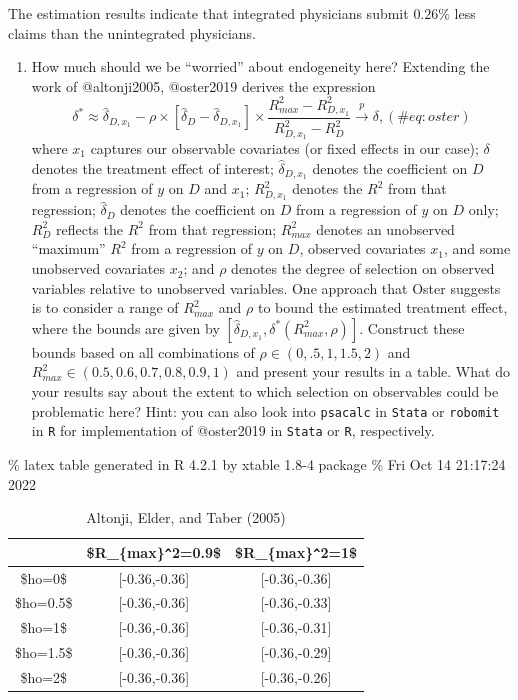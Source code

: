 \documentclass[
  12pt,
]{article}
\providecommand{\tightlist}{%
  \setlength{\itemsep}{0pt}\setlength{\parskip}{0pt}}
\begin{document}
The estimation results indicate that integrated physicians submit
\(0.26\%\) less claims than the unintegrated physicians.

\begin{enumerate}
\def\labelenumi{\arabic{enumi}.}
\setcounter{enumi}{3}
\tightlist
\item
  How much should we be ``worried'' about endogeneity here? Extending
  the work of @altonji2005, @oster2019 derives the expression
  \begin{equation}
   \delta^{*} \approx \hat{\delta}_{D,x_{1}} - \rho \times \left[\hat{\delta}_{D} - \hat{\delta}_{D,x_{1}}\right] \times \frac{R_{max}^{2} - R_{D,x_{1}}^{2}}{R_{D,x_{1}}^{2} - R_{D}^{2}} \xrightarrow{p} \delta,
   (\#eq:oster)
   \end{equation} where \(x_{1}\) captures our observable covariates (or
  fixed effects in our case); \(\delta\) denotes the treatment effect of
  interest; \(\hat{\delta}_{D,x_{1}}\) denotes the coefficient on \(D\)
  from a regression of \(y\) on \(D\) and \(x_{1}\); \(R_{D,x_{1}}^{2}\)
  denotes the \(R^{2}\) from that regression; \(\hat{\delta}_{D}\)
  denotes the coefficient on \(D\) from a regression of \(y\) on \(D\)
  only; \(R_{D}^{2}\) reflects the \(R^{2}\) from that regression;
  \(R_{max}^{2}\) denotes an unobserved ``maximum'' \(R^{2}\) from a
  regression of \(y\) on \(D\), observed covariates \(x_{1}\), and some
  unobserved covariates \(x_{2}\); and \(\rho\) denotes the degree of
  selection on observed variables relative to unobserved variables. One
  approach that Oster suggests is to consider a range of \(R^{2}_{max}\)
  and \(\rho\) to bound the estimated treatment effect, where the bounds
  are given by
  \(\left[ \hat{\delta}_{D,x_{1}}, \delta^{*}(R^{2}_{max}, \rho) \right]\).
  Construct these bounds based on all combinations of
  \(\rho \in (0, .5, 1, 1.5, 2)\) and
  \(R_{max}^{2} \in (0.5, 0.6, 0.7, 0.8, 0.9, 1)\) and present your
  results in a table. What do your results say about the extent to which
  selection on observables could be problematic here? Hint: you can also
  look into \texttt{psacalc} in \texttt{Stata} or \texttt{robomit} in
  \texttt{R} for implementation of @oster2019 in \texttt{Stata} or
  \texttt{R}, respectively.
\end{enumerate}

\% latex table generated in R 4.2.1 by xtable 1.8-4 package \% Fri Oct
14 21:17:24 2022

\begin{table}[ht]
\centering
\begin{tabular}{ccc}
  \hline
 & \$R\_\{max\}\verb|^|2=0.9\$ & \$R\_\{max\}\verb|^|2=1\$ \\ 
  \hline
\$ho=0\$ & [-0.36,-0.36] & [-0.36,-0.36] \\ 
  \$ho=0.5\$ & [-0.36,-0.36] & [-0.36,-0.33] \\ 
  \$ho=1\$ & [-0.36,-0.36] & [-0.36,-0.31] \\ 
  \$ho=1.5\$ & [-0.36,-0.36] & [-0.36,-0.29] \\ 
  \$ho=2\$ & [-0.36,-0.36] & [-0.36,-0.26] \\ 
   \hline
\end{tabular}
\caption{Altonji, Elder, and Taber (2005)} 
\end{table}
\end{document}
